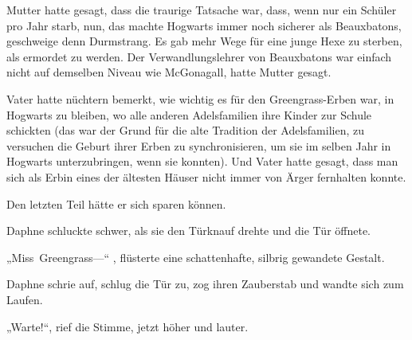 Mutter hatte gesagt, dass die traurige Tatsache war, dass, wenn nur ein Schüler pro Jahr starb, nun, das machte Hogwarts immer noch sicherer als Beauxbatons, geschweige denn Durmstrang. Es gab mehr Wege für eine junge Hexe zu sterben, als ermordet zu werden. Der Verwandlungslehrer von Beauxbatons war einfach nicht auf demselben Niveau wie McGonagall, hatte Mutter gesagt.

Vater hatte nüchtern bemerkt, wie wichtig es für den Greengrass-Erben war, in Hogwarts zu bleiben, wo alle anderen Adelsfamilien ihre Kinder zur Schule schickten (das war der Grund für die alte Tradition der Adelsfamilien, zu versuchen die Geburt ihrer Erben zu synchronisieren, um sie im selben Jahr in Hogwarts unterzubringen, wenn sie konnten). Und Vater hatte gesagt, dass man sich als Erbin eines der ältesten Häuser nicht immer von Ärger fernhalten konnte.

Den letzten Teil hätte er sich sparen können.

Daphne schluckte schwer, als sie den Türknauf drehte und die Tür öffnete.

„Miss~Greengrass—“ , flüsterte eine schattenhafte, silbrig gewandete Gestalt.

Daphne schrie auf, schlug die Tür zu, zog ihren Zauberstab und wandte sich zum Laufen.

„Warte!“, rief die Stimme, jetzt höher und lauter.


